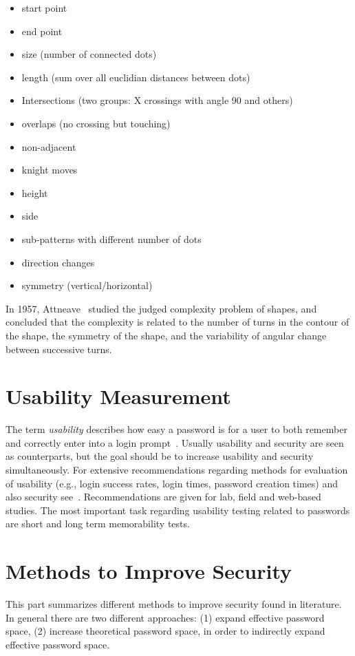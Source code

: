 \documentclass[twocolumn, a4paper, 10pt]{article}
\begin{document}
\begin{itemize}
	\item start point
	\item end point
	\item size (number of connected dots)
	\item length (sum over all euclidian distances between dots)
	\item Intersections (two groups: X crossings with angle 90 and others)
	\item overlaps (no crossing but touching)
	\item non-adjacent
	\item knight moves
	\item height
	\item side
	\item sub-patterns with different number of dots
	\item direction changes
	\item symmetry (vertical/horizontal)
\end{itemize}

In 1957, Attneave~\cite{attneave1957physical} studied the judged complexity problem of shapes, and concluded that the complexity is related to the number of turns in the contour of the shape, the symmetry of the shape, and the variability of angular change between successive turns.


\section{Usability Measurement}
\label{sec:usability}

The term \emph{usability} describes how easy a password is for a user to both remember and correctly enter into a login prompt~\cite{Keith200717}. Usually usability and security are seen as counterparts, but the goal should be to increase usability and security simultaneously. For extensive recommendations regarding methods for evaluation of usability (e.g., login success rates, login times, password creation times) and also security see~\cite{Biddle:2012:GPL:2333112.2333114}. Recommendations are given for lab, field and web-based studies. The most important task regarding usability testing related to passwords are short and long term memorability tests.

\section {Methods to Improve Security}
\label{sec:improve}
This part summarizes different methods to improve security found in literature. In general there are two different approaches: (1) expand effective password space, (2) increase theoretical password space, in order to indirectly expand effective password space. 
\end{document}
